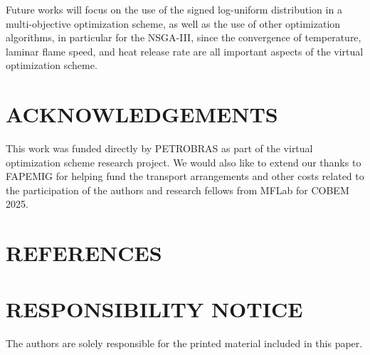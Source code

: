 \documentclass[10pt,fleqn,a4paper,twoside]{article}
\begin{document}
Future works will focus on the use of the signed log-uniform distribution in a multi-objective optimization scheme, as well as the use of other optimization algorithms, in particular for the NSGA-III,
since the convergence of temperature, laminar flame speed, and heat release rate are all important aspects of the virtual optimization scheme.

\section{ACKNOWLEDGEMENTS}

This work was funded directly by PETROBRAS as part of the virtual optimization scheme research project. We would also like to extend our thanks to FAPEMIG for helping fund the transport arrangements and 
other costs related to the participation of the authors and research fellows from MFLab for COBEM 2025.

\section{REFERENCES} 
\label{Sec:references}


\renewcommand{\refname}{}


\section{RESPONSIBILITY NOTICE}
The authors are solely responsible for the printed material included in this paper.
\end{document}
